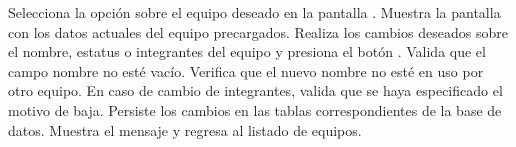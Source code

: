 \begin{UCtrayectoria}
	\UCpaso[\UCactor] Selecciona la opción  sobre el equipo deseado en la pantalla .
	\UCpaso Muestra la pantalla  con los datos actuales del equipo precargados.
	\UCpaso[\UCactor] \label{CU-11.modificaDatos} Realiza los cambios deseados sobre el nombre, estatus o integrantes del equipo y presiona el botón .
	\UCpaso Valida que el campo nombre no esté vacío. 
	\UCpaso Verifica que el nuevo nombre no esté en uso por otro equipo. 
	\UCpaso En caso de cambio de integrantes, valida que se haya especificado el motivo de baja. 
	\UCpaso Persiste los cambios en las tablas correspondientes de la base de datos.
	\UCpaso Muestra el mensaje  y regresa al listado de equipos.
\end{UCtrayectoria}

